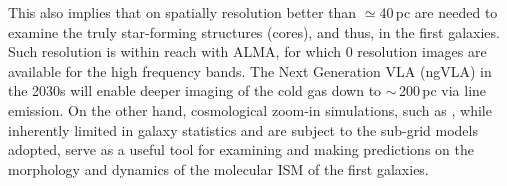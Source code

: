 \IfFileExists{emulateapjlegacy.cls}{\documentclass[iop]{emulateapjlegacy}}{\documentclass[iop]{emulateapj}}
\begin{document}
This also implies that \obs on spatially resolution better than $\simeq$40\,pc are needed to examine the truly star-forming structures (cores), and thus, \SF in the first galaxies.
%
Such resolution is within reach with ALMA, for which 0 resolution images are available for the high frequency bands. The Next Generation VLA (ngVLA) in the 2030s will enable deeper imaging of the cold gas down to $\sim$\,200\,pc via \aco line emission. %
On the other hand, cosmological zoom-in simulations, such as , while inherently limited in galaxy statistics and are subject to the sub-grid models adopted, serve as a useful tool for examining and making predictions on the morphology and dynamics of the molecular ISM of the first galaxies.


\end{document}
